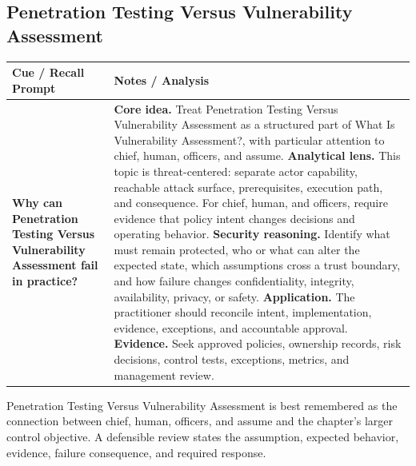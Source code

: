 \documentclass[11pt]{article}
\newcommand{\CornellHeader}{%
\rowcolor{Navy}\color{white}\bfseries Cue / Recall Prompt & \color{white}\bfseries Notes / Analysis\\\hline}
\newcommand{\CornellRow}[2]{%
\cellcolor{CueGray}\RaggedRight\textbf{#1} & \RaggedRight #2\\\hline}
\begin{document}
\subsection*{Penetration Testing Versus Vulnerability Assessment}
\begin{longtable}{>{\RaggedRight\arraybackslash}p{}|>{\RaggedRight\arraybackslash}p{}}
\CornellHeader
\CornellRow{Why can Penetration Testing Versus Vulnerability Assessment fail in practice?}{\textbf{Core idea.} Treat Penetration Testing Versus Vulnerability Assessment as a structured part of What Is Vulnerability Assessment?, with particular attention to chief, human, officers, and assume. \textbf{Analytical lens.} This topic is threat-centered: separate actor capability, reachable attack surface, prerequisites, execution path, and consequence. For chief, human, and officers, require evidence that policy intent changes decisions and operating behavior. \textbf{Security reasoning.} Identify what must remain protected, who or what can alter the expected state, which assumptions cross a trust boundary, and how failure changes confidentiality, integrity, availability, privacy, or safety. \textbf{Application.} The practitioner should reconcile intent, implementation, evidence, exceptions, and accountable approval. \textbf{Evidence.} Seek approved policies, ownership records, risk decisions, control tests, exceptions, metrics, and management review.}
\end{longtable}
\begin{topicsummary}
Penetration Testing Versus Vulnerability Assessment is best remembered as the connection between chief, human, officers, and assume and the chapter's larger control objective. A defensible review states the assumption, expected behavior, evidence, failure consequence, and required response.
\end{topicsummary}
\end{document}
